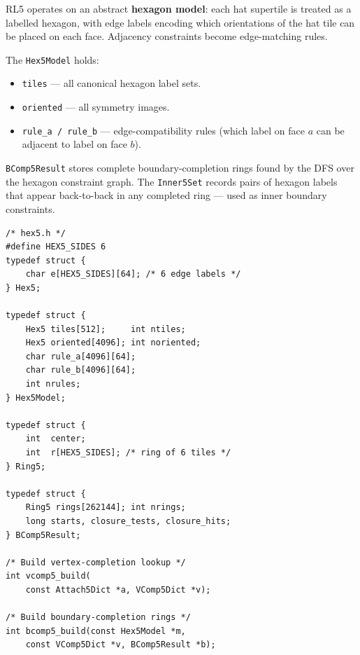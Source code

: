 \documentclass[10pt,a4paper]{article}
\newcommand{\code}[1]{\texttt{\small #1}}
\newcommand{\file}[1]{\texttt{\footnotesize #1}}
\begin{document}
\begin{tcolorbox}[dualbox, title=RL5 — Hexagon Model — \file{src/rl5/hex5.h}]
  RL5 operates on an abstract \textbf{hexagon model}: each hat
  supertile is treated as a labelled hexagon, with edge labels
  encoding which orientations of the hat tile can be placed on each
  face.  Adjacency constraints become edge-matching rules.

  The \code{Hex5Model} holds:
  \begin{itemize}
    \item \code{tiles} — all canonical hexagon label sets.
    \item \code{oriented} — all symmetry images.
    \item \code{rule\_a / rule\_b} — edge-compatibility rules
      (which label on face $a$ can be adjacent to label on face $b$).
  \end{itemize}

  \code{BComp5Result} stores complete boundary-completion rings
  found by the DFS over the hexagon constraint graph.  The
  \code{Inner5Set} records pairs of hexagon labels that appear
  back-to-back in any completed ring — used as inner boundary
  constraints.
\tcblower
\begin{verbatim}
/* hex5.h */
#define HEX5_SIDES 6
typedef struct {
    char e[HEX5_SIDES][64]; /* 6 edge labels */
} Hex5;

typedef struct {
    Hex5 tiles[512];     int ntiles;
    Hex5 oriented[4096]; int noriented;
    char rule_a[4096][64];
    char rule_b[4096][64];
    int nrules;
} Hex5Model;

typedef struct {
    int  center;
    int  r[HEX5_SIDES]; /* ring of 6 tiles */
} Ring5;

typedef struct {
    Ring5 rings[262144]; int nrings;
    long starts, closure_tests, closure_hits;
} BComp5Result;

/* Build vertex-completion lookup */
int vcomp5_build(
    const Attach5Dict *a, VComp5Dict *v);

/* Build boundary-completion rings */
int bcomp5_build(const Hex5Model *m,
    const VComp5Dict *v, BComp5Result *b);
\end{verbatim}
\end{tcolorbox}
\end{document}
